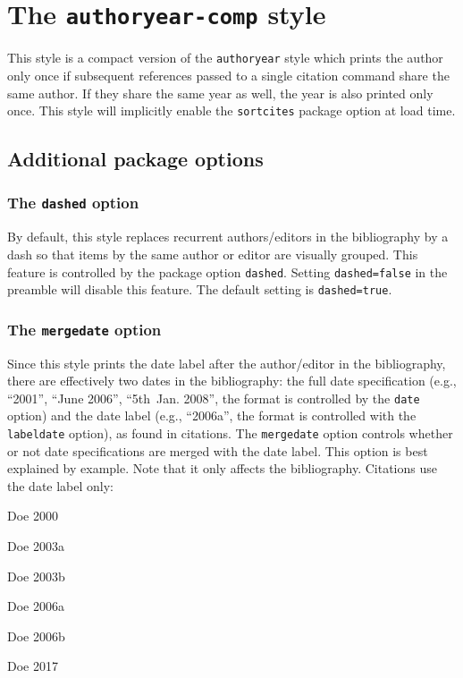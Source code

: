 \documentclass[a4paper]{article}
\newenvironment{bibsample}
  {\trivlist\samepage
   \setlength{\itemsep}{0pt}}
  {\endtrivlist}
\begin{document}
\section*{The \texttt{authoryear-comp} style}

This style is a compact version of the \texttt{authoryear} style
which prints the author only once if subsequent references passed to
a single citation command share the same author. If they share the
same year as well, the year is also printed only once. This style
will implicitly enable the \texttt{sortcites} package option at load
time.

\subsection*{Additional package options}

\subsubsection*{The \texttt{dashed} option}

By default, this style replaces recurrent authors/editors in the
bibliography by a dash so that items by the same author or editor
are visually grouped. This feature is controlled by the package
option \texttt{dashed}. Setting \texttt{dashed=false} in the
preamble will disable this feature. The default setting is
\texttt{dashed=true}.

\subsubsection*{The \texttt{mergedate} option}

Since this style prints the date label after the author/editor in the
bibliography, there are effectively two dates in the bibliography:
the full date specification (e.g., \enquote{2001}, \enquote{June
2006}, \enquote{5th~Jan. 2008}, the format is controlled by the
\texttt{date} option) and the date label (e.g., \enquote{2006a},
the format is controlled with the \texttt{labeldate} option),
as found in citations. The \texttt{mergedate} option controls whether
or not date specifications are merged with the date label.
This option is best explained by example. Note that
it only affects the bibliography. Citations use the date label only:

\begin{bibsample}
\item Doe 2000
\item Doe 2003a
\item Doe 2003b
\item Doe 2006a
\item Doe 2006b
\item Doe 2017
\end{bibsample}
\end{document}
